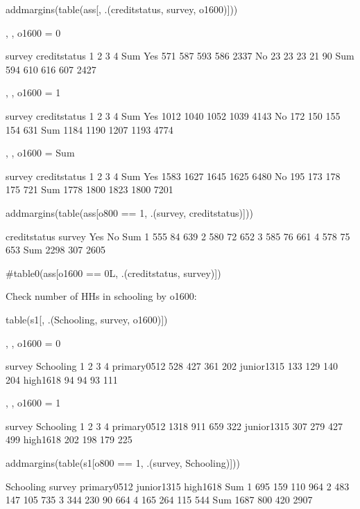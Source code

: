 \begin{Schunk}
\begin{Sinput}
addmargins(table(ass[, .(creditstatus, survey, o1600)]))
\end{Sinput}
\begin{Soutput}
, , o1600 = 0

            survey
creditstatus    1    2    3    4  Sum
         Yes  571  587  593  586 2337
         No    23   23   23   21   90
         Sum  594  610  616  607 2427

, , o1600 = 1

            survey
creditstatus    1    2    3    4  Sum
         Yes 1012 1040 1052 1039 4143
         No   172  150  155  154  631
         Sum 1184 1190 1207 1193 4774

, , o1600 = Sum

            survey
creditstatus    1    2    3    4  Sum
         Yes 1583 1627 1645 1625 6480
         No   195  173  178  175  721
         Sum 1778 1800 1823 1800 7201
\end{Soutput}
\begin{Sinput}
addmargins(table(ass[o800 == 1, .(survey, creditstatus)]))
\end{Sinput}
\begin{Soutput}
      creditstatus
survey  Yes   No  Sum
   1    555   84  639
   2    580   72  652
   3    585   76  661
   4    578   75  653
   Sum 2298  307 2605
\end{Soutput}
\begin{Sinput}
#table0(ass[o1600 == 0L, .(creditstatus, survey)])
\end{Sinput}
\end{Schunk}
Check number of HHs in schooling by \textsf{o1600}:
\begin{Schunk}
\begin{Sinput}
table(s1[, .(Schooling, survey, o1600)])
\end{Sinput}
\begin{Soutput}
, , o1600 = 0

             survey
Schooling        1    2    3    4
  primary0512  528  427  361  202
  junior1315   133  129  140  204
  high1618      94   94   93  111

, , o1600 = 1

             survey
Schooling        1    2    3    4
  primary0512 1318  911  659  322
  junior1315   307  279  427  499
  high1618     202  198  179  225
\end{Soutput}
\begin{Sinput}
addmargins(table(s1[o800 == 1, .(survey, Schooling)]))
\end{Sinput}
\begin{Soutput}
      Schooling
survey primary0512 junior1315 high1618  Sum
   1           695        159      110  964
   2           483        147      105  735
   3           344        230       90  664
   4           165        264      115  544
   Sum        1687        800      420 2907
\end{Soutput}
\end{Schunk}
